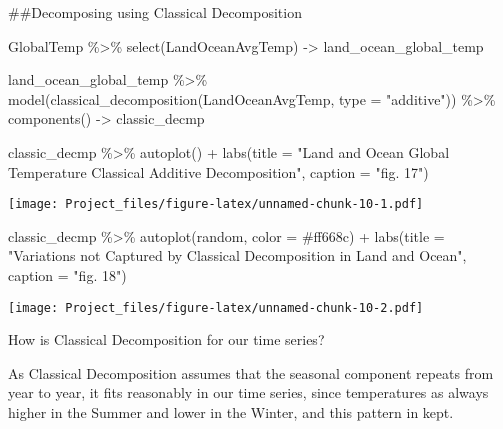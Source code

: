 \documentclass[
]{article}
\newenvironment{Shaded}{\begin{snugshade}}{\end{snugshade}}
\newcommand{\AttributeTok}[1]{\textcolor[rgb]{0.77,0.63,0.00}{#1}}
\newcommand{\FunctionTok}[1]{\textcolor[rgb]{0.00,0.00,0.00}{#1}}
\newcommand{\NormalTok}[1]{#1}
\newcommand{\OtherTok}[1]{\textcolor[rgb]{0.56,0.35,0.01}{#1}}
\newcommand{\SpecialCharTok}[1]{\textcolor[rgb]{0.00,0.00,0.00}{#1}}
\newcommand{\StringTok}[1]{\textcolor[rgb]{0.31,0.60,0.02}{#1}}
\begin{document}
\#\#Decomposing using Classical Decomposition

\begin{Shaded}
\begin{Highlighting}[]
\NormalTok{GlobalTemp }\SpecialCharTok{\%\textgreater{}\%}
  \FunctionTok{select}\NormalTok{(LandOceanAvgTemp) }\OtherTok{{-}\textgreater{}}\NormalTok{ land\_ocean\_global\_temp}

\NormalTok{land\_ocean\_global\_temp }\SpecialCharTok{\%\textgreater{}\%}
  \FunctionTok{model}\NormalTok{(}\FunctionTok{classical\_decomposition}\NormalTok{(LandOceanAvgTemp, }\AttributeTok{type =} \StringTok{"additive"}\NormalTok{)) }\SpecialCharTok{\%\textgreater{}\%}
  \FunctionTok{components}\NormalTok{() }\OtherTok{{-}\textgreater{}}\NormalTok{ classic\_decmp}

\NormalTok{classic\_decmp }\SpecialCharTok{\%\textgreater{}\%}
  \FunctionTok{autoplot}\NormalTok{() }\SpecialCharTok{+}
  \FunctionTok{labs}\NormalTok{(}\AttributeTok{title =} \StringTok{"Land and Ocean Global Temperature Classical Additive Decomposition"}\NormalTok{, }\AttributeTok{caption =} \StringTok{"fig. 17"}\NormalTok{)}
\end{Highlighting}
\end{Shaded}

\texttt{[image: Project\_files/figure-latex/unnamed-chunk-10-1.pdf]}

\begin{Shaded}
\begin{Highlighting}[]
\NormalTok{classic\_decmp }\SpecialCharTok{\%\textgreater{}\%}
  \FunctionTok{autoplot}\NormalTok{(random, }\AttributeTok{color =} \StringTok{\textquotesingle{}\#ff668c\textquotesingle{}}\NormalTok{) }\SpecialCharTok{+}
  \FunctionTok{labs}\NormalTok{(}\AttributeTok{title =} \StringTok{"Variations not Captured by Classical Decomposition in Land and Ocean"}\NormalTok{, }\AttributeTok{caption =} \StringTok{"fig. 18"}\NormalTok{)}
\end{Highlighting}
\end{Shaded}

\texttt{[image: Project\_files/figure-latex/unnamed-chunk-10-2.pdf]}

How is Classical Decomposition for our time series?

As Classical Decomposition assumes that the seasonal component repeats
from year to year, it fits reasonably in our time series, since
temperatures as always higher in the Summer and lower in the Winter, and
this pattern in kept.
\end{document}

